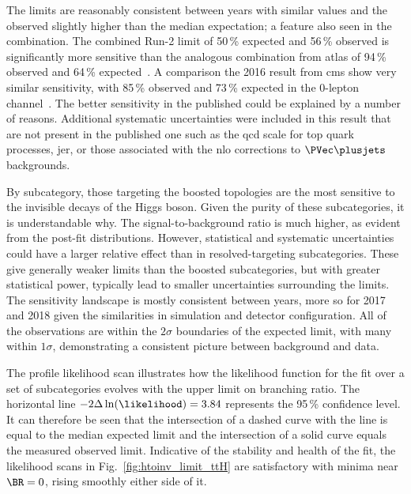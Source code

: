 The limits are reasonably consistent between years with similar values and the observed slightly higher than the median expectation; a feature also seen in the combination. The combined Run-2 limit of 50\,\% expected and 56\,\% observed is significantly more sensitive than the analogous combination from \acrshort{atlas} of 94\,\% observed and 64\,\% expected~\cite{Aad:2020sgw}. A comparison the 2016 result from \acrshort{cms} show very similar sensitivity, with 85\,\% observed and 73\,\% expected in the 0-lepton channel~\cite{CMS-PAS-HIG-18-008}. The better sensitivity in the published could be explained by a number of reasons. Additional systematic uncertainties were included in this result that are not present in the published one such as the \acrshort{qcd} scale for top quark processes, \acrlong{jer}, or those associated with the \acrshort{nlo} corrections to $\PVec \plusjets$ backgrounds.

By subcategory, those targeting the boosted topologies are the most sensitive to the invisible decays of the Higgs boson. Given the purity of these subcategories, it is understandable why. The signal-to-background ratio is much higher, as evident from the post-fit distributions. However, statistical and systematic uncertainties could have a larger relative effect than in resolved-targeting subcategories. These give generally weaker limits than the boosted subcategories, but with greater statistical power, typically lead to smaller uncertainties surrounding the limits. The sensitivity landscape is mostly consistent between years, more so for 2017 and 2018 given the similarities in simulation and detector configuration. All of the observations are within the $\text{2}\sigma$ boundaries of the expected limit, with many within $\text{1}\sigma$, demonstrating a consistent picture between background and data.

The profile likelihood scan illustrates how the likelihood function for the fit over a set of subcategories evolves with the upper limit on branching ratio. The horizontal line $-\text{2}\Delta \ln(\likelihood) = \text{3.84}$ represents the 95\,\% confidence level. It can therefore be seen that the intersection of a dashed curve with the line is equal to the median expected limit and the intersection of a solid curve equals the measured observed limit. Indicative of the stability and health of the fit, the likelihood scans in Fig.~\ref{fig:htoinv_limit_ttH} are satisfactory with minima near $\BR = \text{0}$, rising smoothly either side of it.

\clearpage


